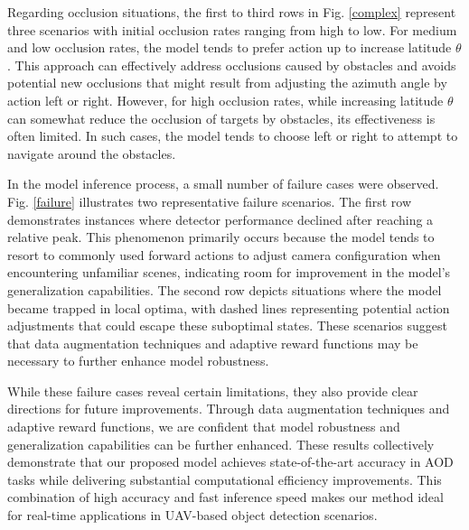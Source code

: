 \documentclass[lettersize,journal]{IEEEtran}
\begin{document}
Regarding occlusion situations, the first to third rows in Fig. \ref{complex} represent three scenarios with initial occlusion rates ranging from high to low. For medium and low occlusion rates, the model tends to prefer action up to increase latitude $\theta$. This approach can effectively address occlusions caused by obstacles and avoids potential new occlusions that might result from adjusting the azimuth angle by action left or right. However, for high occlusion rates, while increasing latitude $\theta$ can somewhat reduce the occlusion of targets by obstacles, its effectiveness is often limited. In such cases, the model tends to choose left or right to attempt to navigate around the obstacles.

In the model inference process, a small number of failure cases were observed. Fig. \ref{failure} illustrates two representative failure scenarios. The first row demonstrates instances where detector performance declined after reaching a relative peak. This phenomenon primarily occurs because the model tends to resort to commonly used forward actions to adjust camera configuration when encountering unfamiliar scenes, indicating room for improvement in the model's generalization capabilities. The second row depicts situations where the model became trapped in local optima, with dashed lines representing potential action adjustments that could escape these suboptimal states. These scenarios suggest that data augmentation techniques and adaptive reward functions may be necessary to further enhance model robustness.

While these failure cases reveal certain limitations, they also provide clear directions for future improvements. Through data augmentation techniques and adaptive reward functions, we are confident that model robustness and generalization capabilities can be further enhanced. These results collectively demonstrate that our proposed model achieves state-of-the-art accuracy in AOD tasks while delivering substantial computational efficiency improvements. 
This combination of high accuracy and fast inference speed makes our method ideal for real-time applications in UAV-based object detection scenarios.
\end{document}
